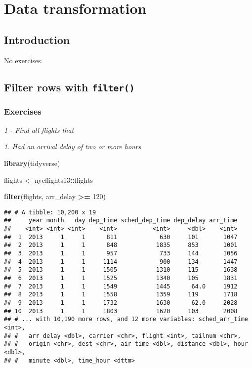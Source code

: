\documentclass[]{article}
\newenvironment{Shaded}{\begin{snugshade}}{\end{snugshade}}
\newcommand{\KeywordTok}[1]{\textcolor[rgb]{0.13,0.29,0.53}{\textbf{#1}}}
\newcommand{\DecValTok}[1]{\textcolor[rgb]{0.00,0.00,0.81}{#1}}
\newcommand{\StringTok}[1]{\textcolor[rgb]{0.31,0.60,0.02}{#1}}
\newcommand{\OperatorTok}[1]{\textcolor[rgb]{0.81,0.36,0.00}{\textbf{#1}}}
\newcommand{\NormalTok}[1]{#1}
\theoremstyle{definition}
\theoremstyle{definition}
\theoremstyle{definition}
\theoremstyle{remark}
\begin{document}
\section{Data transformation}\label{data-transformation}

\subsection{Introduction}\label{introduction-3}

No exercises.

\subsection{\texorpdfstring{Filter rows with
\texttt{filter()}}{Filter rows with filter()}}\label{filter-rows-with-filter}

\subsubsection{Exercises}\label{exercises-7}

\emph{1 - Find all flights that}

\emph{1. Had an arrival delay of two or more hours}

\begin{Shaded}
\begin{Highlighting}[]
\KeywordTok{library}\NormalTok{(tidyverse)}

\NormalTok{flights <-}\StringTok{ }\NormalTok{nycflights13}\OperatorTok{::}\NormalTok{flights}

\KeywordTok{filter}\NormalTok{(flights, arr_delay }\OperatorTok{>=}\StringTok{ }\DecValTok{120}\NormalTok{)}
\end{Highlighting}
\end{Shaded}

\begin{verbatim}
## # A tibble: 10,200 x 19
##     year month   day dep_time sched_dep_time dep_delay arr_time
##    <int> <int> <int>    <int>          <int>     <dbl>    <int>
##  1  2013     1     1      811            630     101       1047
##  2  2013     1     1      848           1835     853       1001
##  3  2013     1     1      957            733     144       1056
##  4  2013     1     1     1114            900     134       1447
##  5  2013     1     1     1505           1310     115       1638
##  6  2013     1     1     1525           1340     105       1831
##  7  2013     1     1     1549           1445      64.0     1912
##  8  2013     1     1     1558           1359     119       1718
##  9  2013     1     1     1732           1630      62.0     2028
## 10  2013     1     1     1803           1620     103       2008
## # ... with 10,190 more rows, and 12 more variables: sched_arr_time <int>,
## #   arr_delay <dbl>, carrier <chr>, flight <int>, tailnum <chr>,
## #   origin <chr>, dest <chr>, air_time <dbl>, distance <dbl>, hour <dbl>,
## #   minute <dbl>, time_hour <dttm>
\end{verbatim}
\end{document}
